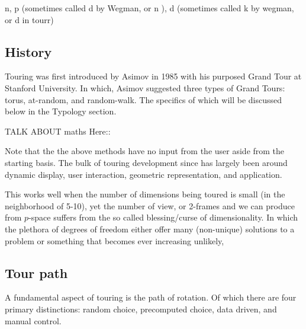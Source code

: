 \documentclass{monashthesis}
\begin{document}
n, p (sometimes called d by Wegman, or n ), d (sometimes called k by
wegman, or d in tourr)

\subsection{History}\label{history}

Touring was first introduced by Asimov in 1985 with his purposed Grand
Tour\autocite{asimov_grand_1985} at Stanford University. In which,
Asimov suggested three types of Grand Tours: torus, at-random, and
random-walk. The specifics of which will be discussed below in the
Typology section.

TALK ABOUT maths Here::

Note that the the above methods have no input from the user aside from
the starting basis. The bulk of touring development since has largely
been around dynamic display, user interaction, geometric representation,
and application.

This works well when the number of dimensions being toured is small (in
the neighborhood of 5-10), yet the number of view, or 2-frames and we
can produce from \(p\)-space suffers from the so called blessing/curse
of dimensionality. In which the plethora of degrees of freedom either
offer many (non-unique) solutions to a problem or something that becomes
ever increasing unlikely,

\subsection{Tour path}\label{tour-path}

A fundamental aspect of touring is the path of rotation. Of which there
are four primary distinctions\autocite{buja_computational_2005}: random
choice, precomputed choice, data driven, and manual control.
\end{document}
